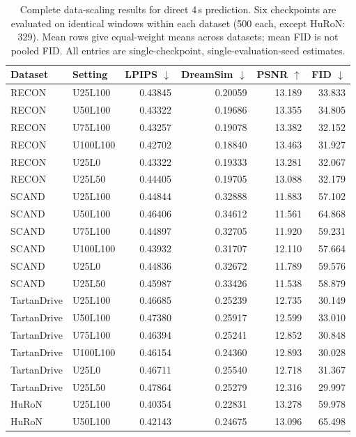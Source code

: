 \begin{table}[t]
\centering
\caption{Complete data-scaling results for direct 4\,s prediction. Six checkpoints are evaluated on identical windows within each dataset (500 each, except HuRoN: 329). Mean rows give equal-weight means across datasets; mean FID is not pooled FID. All entries are single-checkpoint, single-evaluation-seed estimates.}
\label{tab:data_scaling_complete}
\scriptsize
\setlength{\tabcolsep}{7pt}
\begin{tabular}{llrrrr}
\toprule
Dataset & Setting & LPIPS $\downarrow$ & DreamSim $\downarrow$ & PSNR $\uparrow$ & FID $\downarrow$ \\
\midrule
RECON & U25L100 & 0.43845 & 0.20059 & 13.189 & 33.833 \\
RECON & U50L100 & 0.43322 & 0.19686 & 13.355 & 34.805 \\
RECON & U75L100 & 0.43257 & 0.19078 & 13.382 & 32.152 \\
RECON & U100L100 & 0.42702 & 0.18840 & 13.463 & 31.927 \\
RECON & U25L0 & 0.43322 & 0.19333 & 13.281 & 32.067 \\
RECON & U25L50 & 0.44405 & 0.19705 & 13.088 & 32.179 \\
\midrule
SCAND & U25L100 & 0.44844 & 0.32888 & 11.883 & 57.102 \\
SCAND & U50L100 & 0.46406 & 0.34612 & 11.561 & 64.868 \\
SCAND & U75L100 & 0.44897 & 0.32705 & 11.920 & 59.231 \\
SCAND & U100L100 & 0.43932 & 0.31707 & 12.110 & 57.664 \\
SCAND & U25L0 & 0.44836 & 0.32672 & 11.789 & 59.576 \\
SCAND & U25L50 & 0.45987 & 0.33426 & 11.538 & 58.879 \\
\midrule
TartanDrive & U25L100 & 0.46685 & 0.25239 & 12.735 & 30.149 \\
TartanDrive & U50L100 & 0.47380 & 0.25917 & 12.599 & 33.010 \\
TartanDrive & U75L100 & 0.46394 & 0.25241 & 12.852 & 30.848 \\
TartanDrive & U100L100 & 0.46154 & 0.24360 & 12.893 & 30.028 \\
TartanDrive & U25L0 & 0.46711 & 0.25540 & 12.718 & 31.367 \\
TartanDrive & U25L50 & 0.47864 & 0.25279 & 12.316 & 29.997 \\
\midrule
HuRoN & U25L100 & 0.40354 & 0.22831 & 13.278 & 59.978 \\
HuRoN & U50L100 & 0.42143 & 0.24675 & 13.096 & 65.498 \\

\end{tabular}
\end{table}

